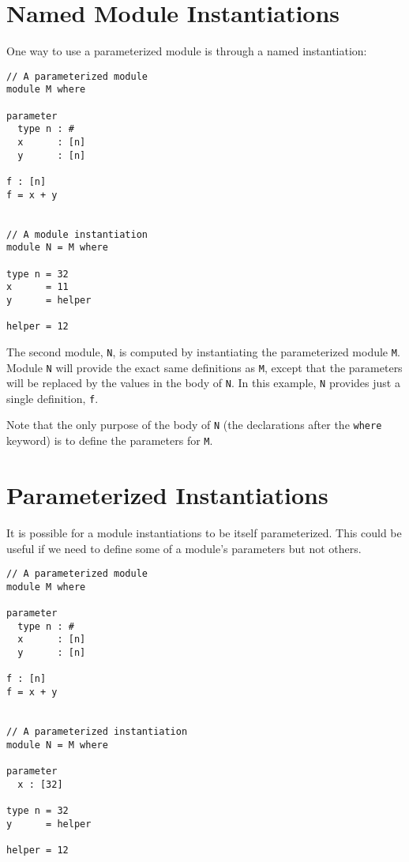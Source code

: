 \hypertarget{named-module-instantiations}{%
\section{Named Module
Instantiations}\label{named-module-instantiations}}

One way to use a parameterized module is through a named instantiation:

\begin{verbatim}
// A parameterized module
module M where

parameter
  type n : #
  x      : [n]
  y      : [n]

f : [n]
f = x + y


// A module instantiation
module N = M where

type n = 32
x      = 11
y      = helper

helper = 12
\end{verbatim}

The second module, \texttt{N}, is computed by instantiating the
parameterized module \texttt{M}. Module \texttt{N} will provide the
exact same definitions as \texttt{M}, except that the parameters will be
replaced by the values in the body of \texttt{N}. In this example,
\texttt{N} provides just a single definition, \texttt{f}.

Note that the only purpose of the body of \texttt{N} (the declarations
after the \texttt{where} keyword) is to define the parameters for
\texttt{M}.

\hypertarget{parameterized-instantiations}{%
\section{Parameterized
Instantiations}\label{parameterized-instantiations}}

It is possible for a module instantiations to be itself parameterized.
This could be useful if we need to define some of a module's parameters
but not others.

\begin{verbatim}
// A parameterized module
module M where

parameter
  type n : #
  x      : [n]
  y      : [n]

f : [n]
f = x + y


// A parameterized instantiation
module N = M where

parameter
  x : [32]

type n = 32
y      = helper

helper = 12
\end{verbatim}

